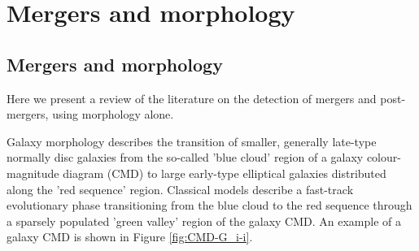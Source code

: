 \section{Mergers and morphology}
\label{sec:mergers}

\subsection{Mergers and morphology}

Here we present a review of the literature on the detection of mergers and post-mergers, using morphology alone.

Galaxy morphology describes the transition of smaller, generally late-type normally disc galaxies from the so-called 'blue cloud' region of a galaxy colour-magnitude diagram (CMD) to large early-type elliptical galaxies distributed along the 'red sequence' region. Classical models describe a fast-track evolutionary phase transitioning from the blue cloud to the red sequence through a sparsely populated 'green valley' region of the galaxy CMD. An example of a galaxy CMD is shown in Figure \ref{fig:CMD-G_i-i}.
